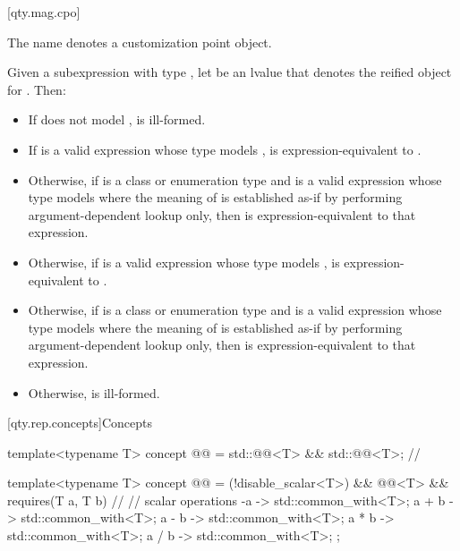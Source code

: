 [qty.mag.cpo]{}

\pnum
The name  denotes a customization point object.

\pnum
Given a subexpression  with type ,
let  be an lvalue that denotes the reified object for .
Then:
\begin{itemize}
\item
If  does not model ,
 is ill-formed.
\item
If  is a valid expression whose type models ,
 is expression-equivalent to .
\item
Otherwise, if  is a class or enumeration type and
 is a valid expression whose type models 
where the meaning of  is established as-if by performing argument-dependent lookup only,
then  is expression-equivalent to that expression.
\item
Otherwise, if  is a valid expression whose type models ,
 is expression-equivalent to .
\item
Otherwise, if  is a class or enumeration type and
 is a valid expression whose type models 
where the meaning of  is established as-if by performing argument-dependent lookup only,
then  is expression-equivalent to that expression.
\item
Otherwise,  is ill-formed.
\end{itemize}

[qty.rep.concepts]{Concepts}

\begin{itemdecl}
template<typename T>
concept @@ = std::@@<T> && std::@@<T>;  // \expos

template<typename T>
concept @@ = (!disable_scalar<T>) && @@<T> && requires(T a, T b) {  // \expos
  // scalar operations
  { -a } -> std::common_with<T>;
  { a + b } -> std::common_with<T>;
  { a - b } -> std::common_with<T>;
  { a * b } -> std::common_with<T>;
  { a / b } -> std::common_with<T>;
};
\end{itemdecl}

